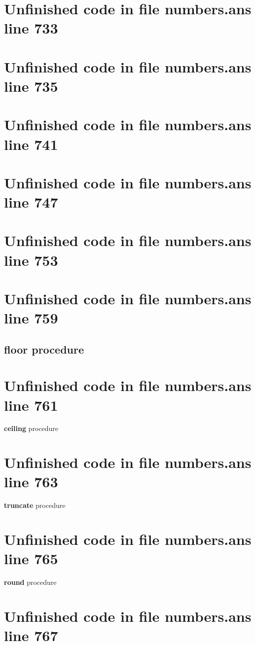 \documentclass[twoside,9pt]{report}
\begin{document}
\section{Unfinished code in file numbers.ans line 733}
\section{Unfinished code in file numbers.ans line 735}
\section{Unfinished code in file numbers.ans line 741}
\section{Unfinished code in file numbers.ans line 747}
\section{Unfinished code in file numbers.ans line 753}
\section{Unfinished code in file numbers.ans line 759}
\subsection{floor procedure}
\label{floor-procedure}
\section{Unfinished code in file numbers.ans line 761}

\noindent \textbf{ceiling} procedure

\section{Unfinished code in file numbers.ans line 763}

\noindent \textbf{truncate} procedure

\section{Unfinished code in file numbers.ans line 765}

\noindent \textbf{round} procedure

\section{Unfinished code in file numbers.ans line 767}
\end{document}
